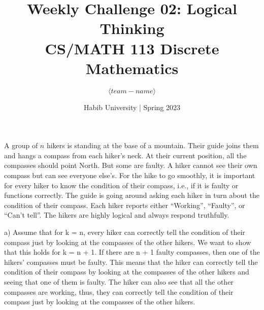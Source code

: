 \documentclass[a4paper]{exam}
\title{Weekly Challenge 02: Logical Thinking\\CS/MATH 113 Discrete Mathematics}
\author{$\langle team-name \rangle$}  %
\date{Habib University | Spring 2023}
\begin{document}
\maketitle

\begin{questions}
  
  A group of $n$ hikers is standing at the base of a mountain. Their guide joins them and hangs a compass from each hiker's neck. At their current position, all the compasses should point North. But some are faulty. A hiker cannot see their own compass but can see everyone else's. For the hike to go smoothly, it is important for every hiker to know the condition of their compass, i.e., if it is faulty or functions correctly. The guide is going around asking each hiker in turn about the condition of their compass. Each hiker reports either ``Working'', ``Faulty'', or ``Can't tell''. The hikers are highly logical and always respond truthfully.


  \begin{solution}
    a) Assume that for k = n, every hiker can correctly tell the condition of their compass just by looking at the compasses of the other hikers. We want to show that this holds for k = n + 1. If there are n + 1 faulty compasses, then one of the hikers' compasses must be faulty. This means that the hiker can correctly tell the condition of their compass by looking at the compasses of the other hikers and seeing that one of them is faulty. The hiker can also see that all the other compasses are working, thus, they can correctly tell the condition of their compass just by looking at the compasses of the other hikers.


\end{solution}
\end{questions}
\end{document}

